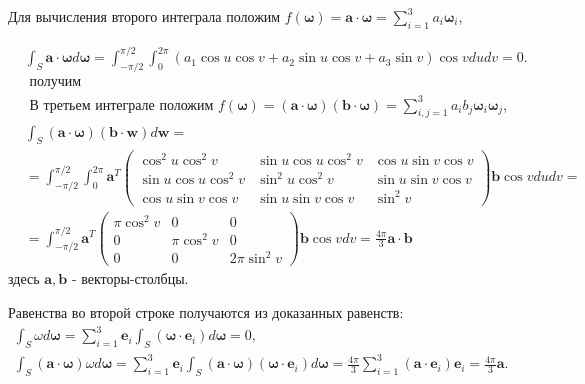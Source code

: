 Для вычисления второго интеграла положим
$f(\boldsymbol{\omega})=\mathbf{a} \cdot \boldsymbol{\omega}=\sum_{i=1}^{3} a_{i} \boldsymbol{\omega}_{i}$,

\[
    \begin{aligned}
        & \int_{S} \mathbf{a} \cdot \boldsymbol{\omega} d \boldsymbol{\omega}=
        \int_{-\pi / 2}^{\pi / 2}
        \int_{0}^{2 \pi}\left(a_{1} \cos u \cos v+a_{2} \sin u \cos v+a_{3} \sin v\right) \cos v d u d v=0. \\
        & \text { получим } \\
        & \text { В третьем интеграле положим } f(\boldsymbol{\omega})=(\mathbf{a} \cdot \boldsymbol{\omega})(\mathbf{b} \cdot \boldsymbol{\omega})=\sum_{i, j=1}^{3} a_{i} b_{j} \boldsymbol{\omega}_{i} \boldsymbol{\omega}_{j} \text {, } \\
        & \int_{S}(\mathbf{a} \cdot \boldsymbol{\omega})(\mathbf{b} \cdot \boldsymbol{w}) d \boldsymbol{w}= \\
        & =\int_{-\pi / 2}^{\pi / 2} \int_{0}^{2 \pi} \mathbf{a}^{T}\left(\begin{array}{ccc}
                                                                              \cos ^{2} u \cos ^{2} v & \sin u \cos u \cos ^{2} v & \cos u \sin v \cos v \\\sin u \cos u \cos ^{2} v & \sin ^{2} u \cos ^{2} v & \sin u \sin v \cos v \\\cos u \sin v \cos v & \sin u \sin v \cos v & \sin ^{2} v
        \end{array}\right) \mathbf{b} \cos v d u d v= \\
        & =\int_{-\pi / 2}^{\pi / 2} \mathbf{a}^{T}\left(\begin{array}{ccc}
                                                             \pi \cos ^{2} v & 0 & 0 \\0 & \pi \cos ^{2} v & 0 \\0 & 0 & 2 \pi \sin ^{2} v
        \end{array}\right) \mathbf{b} \cos v d v=\frac{4 \pi}{3} \mathbf{a} \cdot \mathbf{b}
    \end{aligned}
\]
здесь $\mathbf{a}, \mathbf{b}$ - векторы-столбцы.


Равенства во второй строке получаются из доказанных равенств:
\[
    \begin{gathered}
        \int_{S} \omega d \boldsymbol{\omega}=\sum_{i=1}^{3} \mathbf{e}_{i}
        \int_{S}\left(\boldsymbol{\omega} \cdot \mathbf{e}_{i}\right) d \boldsymbol{\omega}=0, \\
        \int_{S}(\mathbf{a} \cdot \boldsymbol{\omega}) \omega d
        \boldsymbol{\omega}=\sum_{i=1}^{3} \mathbf{e}_{i}
        \int_{S}(\mathbf{a} \cdot \boldsymbol{\omega})\left(\boldsymbol{\omega} \cdot \mathbf{e}_{i}\right) d
        \boldsymbol{\omega}=\frac{4 \pi}{3} \sum_{i=1}^{3}\left(\mathbf{a} \cdot \mathbf{e}_{i}\right)
        \mathbf{e}_{i}=\frac{4 \pi}{3} \mathbf{a}.
    \end{gathered}
\]


